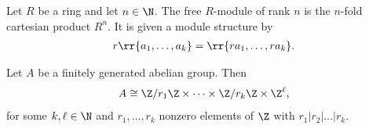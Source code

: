 \documentclass{article}
\begin{document}
\begin{definition}\label{def:free-module}
  Let $R$ be a ring and let $n\in\N$. The free $R$-module of rank $n$ is the $n$-fold
  cartesian product $R^n$. It is given a module structure by
  \begin{align*}
    r\rr{a_1,\ldots,a_k}=\rr{ra_1,\ldots,ra_k}.
  \end{align*}
\end{definition}

\begin{theorem}
  Let $A$ be a finitely generated abelian group. Then 
  \begin{align*}
    A\cong \Z/r_1\Z\times\cdots\times \Z/r_k\Z\times \Z^\ell,
  \end{align*}
  for some $k,\ell\in\N$ and $r_1,...,r_k$ nonzero elements of $\Z$ with $r_1\vert r_2\vert\ldots\vert r_k$.
\end{theorem}
\end{document}
